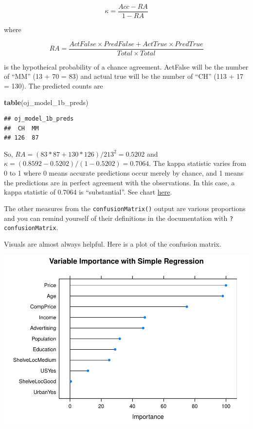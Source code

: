 \documentclass[
]{book}
\newenvironment{Shaded}{\begin{snugshade}}{\end{snugshade}}
\newcommand{\DataTypeTok}[1]{\textcolor[rgb]{0.13,0.29,0.53}{#1}}
\newcommand{\KeywordTok}[1]{\textcolor[rgb]{0.13,0.29,0.53}{\textbf{#1}}}
\newcommand{\NormalTok}[1]{#1}
\newcommand{\OperatorTok}[1]{\textcolor[rgb]{0.81,0.36,0.00}{\textbf{#1}}}
\newcommand{\StringTok}[1]{\textcolor[rgb]{0.31,0.60,0.02}{#1}}
\begin{document}
\[\kappa = \frac{Acc - RA}{1-RA}\]

where

\[RA = \frac{ActFalse \times PredFalse + ActTrue \times PredTrue}{Total \times Total}\]

is the hypotheical probability of a chance agreement. ActFalse will be the number of ``MM'' (13 + 70 = 83) and actual true will be the number of ``CH'' (113 + 17 = 130). The predicted counts are

\begin{Shaded}
\begin{Highlighting}[]
\KeywordTok{table}\NormalTok{(oj_model_1b_preds)}
\end{Highlighting}
\end{Shaded}

\begin{verbatim}
## oj_model_1b_preds
##  CH  MM 
## 126  87
\end{verbatim}

So, \(RA = (83*87 + 130*126) / 213^2 = 0.5202\) and \(\kappa = (0.8592 - 0.5202)/(1 - 0.5202) = 0.7064\). The kappa statistic varies from 0 to 1 where 0 means accurate predictions occur merely by chance, and 1 means the predictions are in perfect agreement with the observations. In this case, a kappa statistic of 0.7064 is ``substantial''. See chart \href{https://www.statisticshowto.datasciencecentral.com/cohens-kappa-statistic/}{here}.

The other measures from the \texttt{confusionMatrix()} output are various proportions and you can remind yourself of their definitions in the documentation with \texttt{?confusionMatrix}.

Visuals are almost always helpful. Here is a plot of the confusion matrix.

\begin{Shaded}
\end{Shaded}

\includegraphics{data-sci_files/figure-latex/unnamed-chunk-76-1.pdf}
\end{document}

